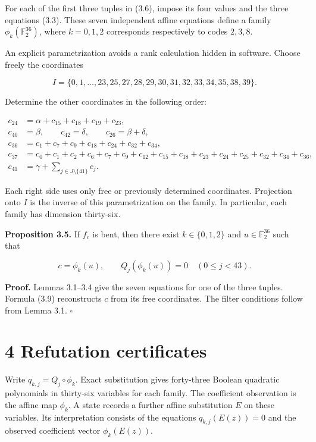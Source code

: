 \documentclass[11pt,a4paper]{article}
\begin{document}
For each of the first three tuples in (3.6), impose its four values and the three equations (3.3). These seven independent affine equations define a family $\phi_k(\mathbb F_2^{36})$, where $k=0,1,2$ corresponds respectively to codes $2,3,8$.

An explicit parametrization avoids a rank calculation hidden in software. Choose freely the coordinates

\[
I=\{0,1,\ldots,23,25,27,28,29,30,31,32,33,34,35,38,39\}.
\]

Determine the other coordinates in the following order:

\[
\begin{aligned}
c_{24}&=\alpha+c_{15}+c_{18}+c_{19}+c_{23},\\
c_{40}&=\beta,\qquad c_{42}=\delta,\qquad c_{26}=\beta+\delta,\\
c_{36}&=c_1+c_7+c_9+c_{18}+c_{24}+c_{32}+c_{34},\\
c_{37}&=c_0+c_1+c_2+c_6+c_7+c_9+c_{12}+c_{15}+c_{18}
 +c_{23}+c_{24}+c_{25}+c_{32}+c_{34}+c_{36},\\
c_{41}&=\gamma+\sum_{j\in J\setminus\{41\}}c_j.
\end{aligned} \tag{3.9}
\]

Each right side uses only free or previously determined coordinates. Projection onto $I$ is the inverse of this parametrization on the family. In particular, each family has dimension thirty-six.

\textbf{Proposition 3.5.} If $f_c$ is bent, then there exist $k\in\{0,1,2\}$ and $u\in\mathbb F_2^{36}$ such that

\[
c=\phi_k(u),\qquad Q_j(\phi_k(u))=0\quad(0\le j<43). \tag{3.10}
\]

\textbf{Proof.} Lemmas 3.1--3.4 give the seven equations for one of the three tuples. Formula (3.9) reconstructs $c$ from its free coordinates. The filter conditions follow from Lemma 3.1. \hfill$\square$

\section*{4 Refutation certificates}

Write $q_{k,j}=Q_j\circ\phi_k$. Exact substitution gives forty-three Boolean quadratic polynomials in thirty-six variables for each family. The coefficient observation is the affine map $\phi_k$. A state records a further affine substitution $E$ on these variables. Its interpretation consists of the equations $q_{k,j}(E(z))=0$ and the observed coefficient vector $\phi_k(E(z))$.
\end{document}
